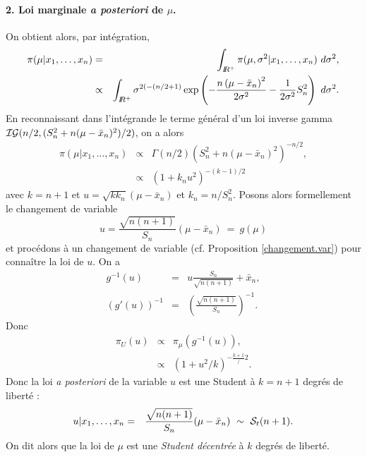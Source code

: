 \paragraph{2. Loi marginale {\it a posteriori} de $\mu$.}
On obtient alors,
par intégration,
\begin{eqnarray*}
\pi(\mu|x_1,\ldots,x_n) & = & \int_{I\!\!R^+} \pi(\mu,\sigma^2|x_1,\ldots,x_n) \ d\sigma^2, \\
& \propto & \int_{I\!\!R^+} \sigma^{2(-(n/2+1)} \exp \left( - \frac{n\left(\mu-\bar{x}_n\right)^2}{2\sigma^2} -\frac{1}{2\sigma^2} S_n^2
\right) \ d\sigma^2.
\end{eqnarray*}
En reconnaissant dans l'intégrande le terme général d'un loi inverse gamma ${\cal{IG}}(n/2,(S^2_n + n(\mu-\bar{x}_n)^2)/2)$, on a alors
\begin{eqnarray*}
\pi(\mu|x_1,\ldots,x_n) & \propto & \Gamma(n/2)\left(S^2_n + n(\mu-\bar{x}_n)^2\right)^{-n/2}, \\
& \propto & \left(1+k_n u^2\right)^{-(k-1)/2}
\end{eqnarray*}
avec $k=n+1$ et $u=\sqrt{k k_n}(\mu-\bar{x}_n)$ et $k_n=n/S^2_n$. %
Posons alors formellement le changement de variable 
$$
u = \frac{\sqrt{n(n+1)}}{S_n}(\mu-\bar{x}_n) \ = \ g(\mu)
$$
et procédons à un changement de variable (cf. Proposition \ref{changement.var}) pour connaître la loi de $u$. On a 
\begin{eqnarray*}
g^{-1}(u) & = & u \frac{S_n}{\sqrt{n(n+1)}} + \bar{x}_n, \\
(g'(u))^{-1} & = &  \left(\frac{\sqrt{n(n+1)}}{S_n}\right)^{-1}.
\end{eqnarray*}
Donc
\begin{eqnarray*}
\pi_U(u) & \propto & \pi_{\mu}(g^{-1}(u)), \\
& \propto & (1+u^2/k)^{-\frac{k+1}/2}.
\end{eqnarray*}
Donc la loi {\it a posteriori} de la variable $u$ est une Student à $k=n+1$ degrés de liberté :
\begin{eqnarray*}
u|x_1,\ldots,x_n & = & \frac{\sqrt{n(n+1)}}{S_n}(\mu-\bar{x}_n) \ \sim \ {\cal{S}}_t(n+1).
\end{eqnarray*}
On dit alors que la loi de $\mu$ est une \emph{Student décentrée} à $k$ degrés de liberté. 

